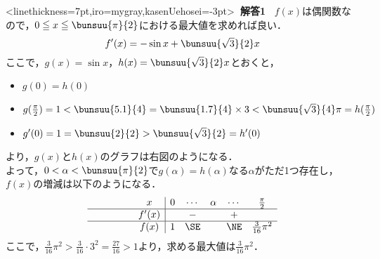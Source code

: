 \documentclass[10pt,
b5paper,
fleqn,
dvipdfmx,
uplatex
]{jsarticle}
\newcommand{\bb}{\bf\boldmath}%
\newcommand{\sq}{\textstyle\sqrt}
\newenvironment{leftbbar}{%
\def\FrameCommand{\color{mygray} \vrule width 5pt \hspace{1zw}
\color{black}}%
\MakeFramed {\advance\hsize-\width \FrameRestore}}%
{\endMakeFramed}
\newenvironment{解答1}{
\hspace{-2zw}\phkasen<linethickness=7pt,iro=mygray,kasenUehosei=-3pt>{\bf \large \ 解答1\ }\vspace{-1zw}\begin{leftbbar}}{\end{leftbbar}}
\begin{document}
{\newpage

\begin{解答1}
$f(x)$は偶関数なので，$0\leqq x \leqq \bunsuu{\pi}{2}$における最大値を求めれば良い．
\[f'(x)=-\sin x+\bunsuu{\sq{3}}{2}x\]
ここで，$g(x)=\sin x$，$h(x)=\bunsuu{\sq{3}}{2}x$とおくと，
\begin{mawarikomi}{}{
\iffigure
{}
\fi
}
\begin{itemize}
\item $g(0)=h(0)$
\item $g(\frac{\pi}{2})=1<\bunsuu{5.1}{4}=\bunsuu{1.7}{4}\times 3<\bunsuu{\sq{3}}{4}\pi =h(\frac{\pi}{2})$
\item $g'(0)=1=\bunsuu{2}{2}>\bunsuu{\sq{3}}{2}=h'(0)$
\end{itemize}
より，$g(x)$と$h(x)$のグラフは右図のようになる．\\
よって，$0<\alpha<\bunsuu{\pi}{2}$で$g(\alpha)=h(\alpha)$なる$\alpha$がただ1つ存在し，$f(x)$の増減は以下のようになる．
\[\begin{array}{c|cccccc}
\phantom{\bunsuu 11} x	&0		&\cdots	&\alpha 	&\cdots	&\frac{\pi}{2} 	\\\hline
\phantom{\bunsuu 11}f'(x)	&		&-		&		&+		&				\\\hline
\phantom{\bunsuu 11}f(x)	&1		&\SE	&		&\NE	&\frac{3}{16}\pi^2\\
\end{array}
\]
ここで，$\frac{3}{16}\pi^2>\frac{3}{16}\cdot 3^2=\frac{27}{16}>1$より，求める最大値は{\bb $\frac{3}{16}\pi^2$}．
\end{mawarikomi}
\end{解答1}

}
\end{document}

